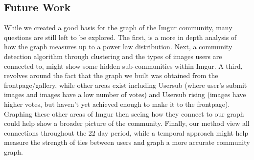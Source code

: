 \documentclass{article}
\begin{document}
\subsection{Future Work}
\par While we created a good basis for the graph of the Imgur community, many questions are still left to be explored. The first, is a more in depth analysis of how the graph measures up to a power law distribution. Next, a community detection algorithm through clustering and the types of images users are connected to, might show some hidden sub-communities within Imgur. A third, revolves around the fact that the graph we built was obtained from the frontpage/gallery, while other areas exist including Usersub (where user's submit images and images have a low number of votes) and Usersub rising (images have higher votes, but haven't yet achieved enough to make it to the frontpage). Graphing these other areas of Imgur then seeing how they connect to our graph could help show a broader picture of the community. Finally, 
our method view all connections throughout the 22 day period, while a temporal approach might help measure the strength of ties between users and graph a more accurate community graph. 

\medskip
\printbibliography
\end{document}

